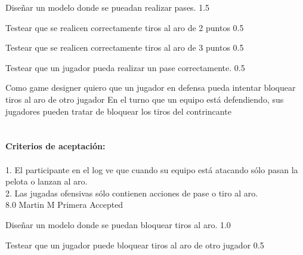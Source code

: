 		{Diseñar un modelo donde se pueadan realizar pases.} %
		{} %
		{1.5} %
		{} %
		{} %
		{} %

		{Testear que se realicen correctamente tiros al aro de 2 puntos} %
		{} %
		{0.5} %
		{} %
		{} %
		{} %

		{Testear que se realicen correctamente tiros al aro de 3 puntos} %
		{} %
		{0.5} %
		{} %
		{} %
		{} %

		{Testear que un jugador pueda realizar un pase correctamente.} %
		{} %
		{0.5} %
		{} %
		{} %
		{} %



\vspace{20pt}


	{Como game designer quiero que un jugador en defensa pueda intentar bloquear tiros al aro de otro jugador} %
	{En el turno que un equipo está defendiendo, sus jugadores pueden tratar de bloquear los tiros del contrincante \\
  \\
  \\
\textbf{Criterios de aceptación:}\\
  \\
1. El participante en el log ve que cuando su equipo está atacando sólo pasan la pelota o lanzan al aro. \\
2. Las jugadas ofensivas sólo contienen acciones de pase o tiro al aro. \\
} %
	{} %
	{8.0} %
	{Martin M} %
	{Primera} %
	{Accepted} %

	
		{Diseñar un modelo donde se puedan bloquear tiros al aro.} %
		{} %
		{1.0} %
		{} %
		{} %
		{} %

		{Testear que un jugador puede bloquear tiros al aro de otro jugador} %
		{} %
		{0.5} %
		{} %
		{} %
		{} %

